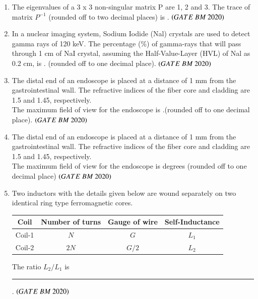 \documentclass[journal,12pt,onecolumn]{IEEEtran}
\theoremstyle{remark}
\begin{document}
\begin{enumerate}
\item The eigenvalues of a 3 x 3 non-singular matrix P are 1, 2 and 3. The trace of matrix \( P^{-1} \) (rounded off to two decimal places) is \underline{\hspace{2cm}}.
 \hfill $\brak{GATE\ BM\ 2020}$
 
\item In a nuclear imaging system, Sodium Iodide (Nal) crystals are used to detect gamma rays of 120 keV. The percentage (\%)
of gamma-rays that will pass through 1 cm of NaI crystal, assuming the Half-Value-Layer (HVL) of Nal as 0.2 cm, is \underline{\hspace{2cm}}.
(rounded off to one decimal place).
 \hfill $\brak{GATE\ BM\ 2020}$
 
\item The distal end of an endoscope is placed at a distance of 1 mm from the
gastrointestinal wall. The refractive indices of the fiber core and cladding are 1.5
and 1.45, respectively.\\
The maximum field of view for the endoscope is \underline{\hspace{2cm}}.(rounded off to one decimal place). \hfill $\brak{GATE\ BM\ 2020}$

\item The distal end of an endoscope is placed at a distance of 1 mm from the
gastrointestinal wall. The refractive indices of the fiber core and cladding are 1.5
and 1.45, respectively.\\
The maximum field of view for the endoscope is  \underline{\hspace{2cm}} degrees
(rounded off to one decimal place)  \hfill $\brak{GATE\ BM\ 2020}$


\item Two inductors with the details given below are wound separately on two identical ring type ferromagnetic cores.
\begin{center}
\begin{tabular}{|c|c|c|c|}
\hline
\textbf{Coil} & \textbf{Number of turns} & \textbf{Gauge of wire} & \textbf{Self-Inductance} \\
\hline
Coil-1 & $N$ & $G$ & $L_1$ \\
\hline
Coil-2 & $2N$ & $G/2$ & $L_2$ \\
\hline
\end{tabular}
\end{center}

The ratio $L_2 / L_1$ is \rule{3cm}{0.15mm}.  \hfill $\brak{GATE\ BM\ 2020}$


\end{enumerate}
\end{document}

